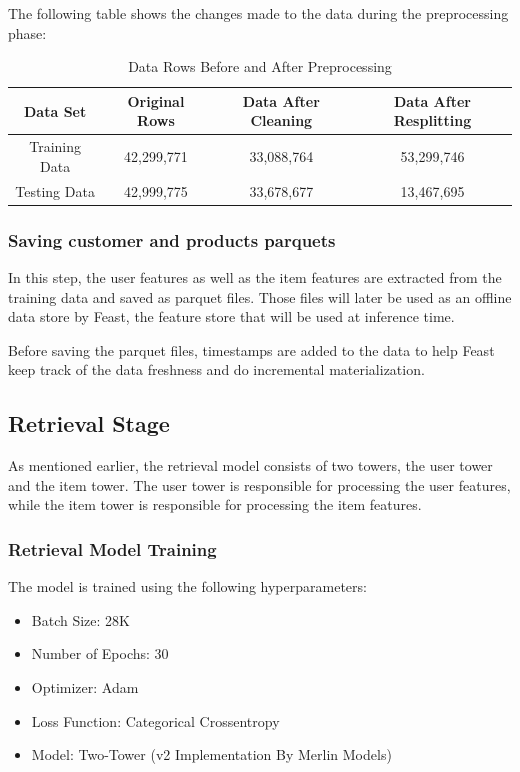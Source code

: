 The following table shows the changes made to the data during the preprocessing phase:

\begin{table}[ht]
\centering
\begin{tabular}{|c|c|c|c|}
\hline
\textbf{Data Set} & \textbf{Original Rows} & \textbf{Data After Cleaning} & \textbf{Data After Resplitting} \\
\hline
Training Data & 42,299,771 & 33,088,764 & 53,299,746 \\
\hline
Testing Data & 42,999,775 & 33,678,677 & 13,467,695 \\
\hline
\end{tabular}
\caption{Data Rows Before and After Preprocessing}
\label{tab:data-reprocessing}
\end{table}

\subsubsection{Saving customer and products parquets}

In this step, the user features as well as the item features are extracted from the training data and saved as parquet files.
Those files will later be used as an offline data store by Feast, the feature store that will be used at inference time.

Before saving the parquet files, timestamps are added to the data to help Feast keep track of the data freshness and do incremental materialization.

\subsection{Retrieval Stage}

As mentioned earlier, the retrieval model consists of two towers, the user tower and the item tower. 
The user tower is responsible for processing the user features, while the item tower is responsible for processing the item features.

\subsubsection{Retrieval Model Training}

The model is trained using the following hyperparameters:

\begin{itemize}
\item Batch Size: 28K
\item Number of Epochs: 30
\item Optimizer: Adam
\item Loss Function: Categorical Crossentropy
\item Model: Two-Tower (v2 Implementation By Merlin Models)
\end{itemize}

